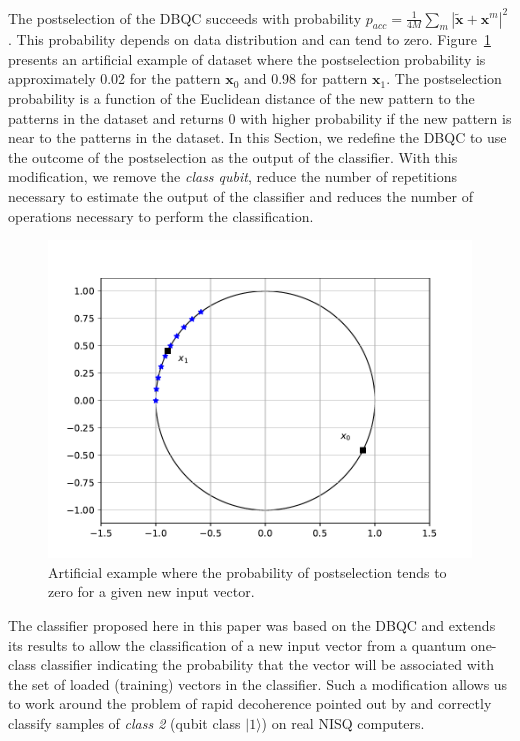 \documentclass{esannV2}
\begin{document}
The postselection of the DBQC \cite{schuld2017implementing} succeeds with probability $p_{acc}=\frac{1}{4M}\sum_m|\tilde{\mathbf{x}} + \mathbf{x}^{m}|^2$.  This probability depends on data distribution and can tend to zero. Figure~\ref{fig:example_pacc} presents an artificial example of dataset where the postselection probability is approximately 0.02 for the pattern $\mathbf{x}_0$ and 0.98 for pattern $\mathbf{x}_1$. The postselection probability is a function of the Euclidean distance of the new pattern to the patterns in the dataset and returns 0 with higher probability if the new pattern is near to the patterns in the dataset. In this Section, we redefine the DBQC to use the outcome of the postselection as the output of the classifier. With this modification, we remove the \textit{class qubit}, reduce the number of repetitions necessary to estimate the output of the classifier and reduces the number of operations necessary to perform the classification.

\begin{figure}[ht]
    \centering
    \includegraphics[scale=0.4]{fig1}
    \caption{Artificial example where the probability of postselection tends to zero for a given new input vector.}
    \label{fig:example_pacc}
\end{figure}

The classifier proposed here in this paper was based on the DBQC and extends its results to allow the classification of a new input vector from a quantum one-class classifier indicating the probability that the vector will be associated with the set of loaded (training) vectors in the classifier. Such a modification allows us to work around the problem of rapid decoherence pointed out by \cite{schuld2017implementing} and correctly classify samples of \textit{class 2} (qubit class $|1\rangle$) on real NISQ computers.
\end{document}
